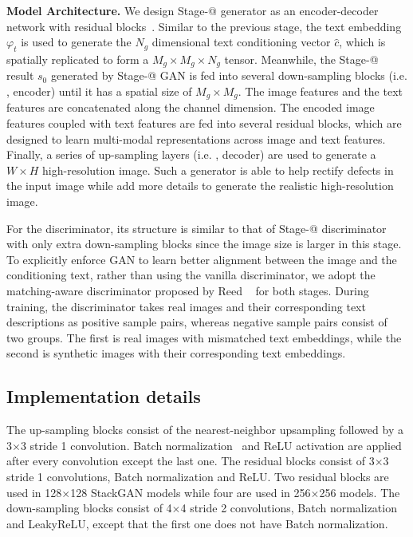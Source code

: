 \textbf{Model Architecture. } We design Stage-\expandafter\@slowromancap{}@ generator as an encoder-decoder network with residual blocks~\cite{HeZRS15}. Similar to the previous stage, the text embedding $\varphi_{t}$ is used to generate the $N_g$ dimensional text conditioning vector $\hat{c}$, which is spatially replicated to form a $M_{g} \times M_{g} \times N_g$ tensor. Meanwhile, the Stage-\expandafter\@slowromancap{}@ result $s_0$ generated by Stage-\expandafter\@slowromancap{}@ GAN is fed into several down-sampling blocks (i.e. , encoder) until it has a spatial size of $M_{g} \times M_{g}$. The image features and the text features are concatenated along the channel dimension. The encoded image features coupled with text features are fed into several residual blocks, which are designed to learn multi-modal representations across image and text features. Finally, a series of up-sampling layers (i.e. , decoder) are used to generate a $W \times H$ high-resolution image. Such a generator is able to help rectify defects in the input image while add more details to generate the realistic high-resolution image.

For the discriminator, its structure is similar to that of Stage-\expandafter\@slowromancap{}@ discriminator with only extra down-sampling blocks since the image size is larger in this stage. To explicitly enforce GAN to learn better alignment between the image and the conditioning text, rather than using the vanilla discriminator, we adopt the matching-aware discriminator proposed by Reed \etal~\cite{reed2016generative} for both stages. During training, the discriminator takes real images and their corresponding text descriptions as positive sample pairs, whereas negative sample pairs consist of two groups. The first is real images with mismatched text embeddings, while the second is synthetic images with their corresponding text embeddings. 

\subsection{Implementation details}

The up-sampling blocks consist of the nearest-neighbor upsampling followed by a 3$\times$3 stride 1 convolution. Batch normalization~\cite{IoffeS15} and ReLU activation are applied after every convolution except the last one.  The residual blocks consist of  3$\times$3 stride 1 convolutions, Batch normalization and ReLU. Two residual blocks are used in 128$\times$128 StackGAN models while four are used in 256$\times$256 models. The down-sampling blocks consist of 4$\times$4 stride 2 convolutions, Batch normalization and LeakyReLU, except that the first one does not have Batch normalization.

